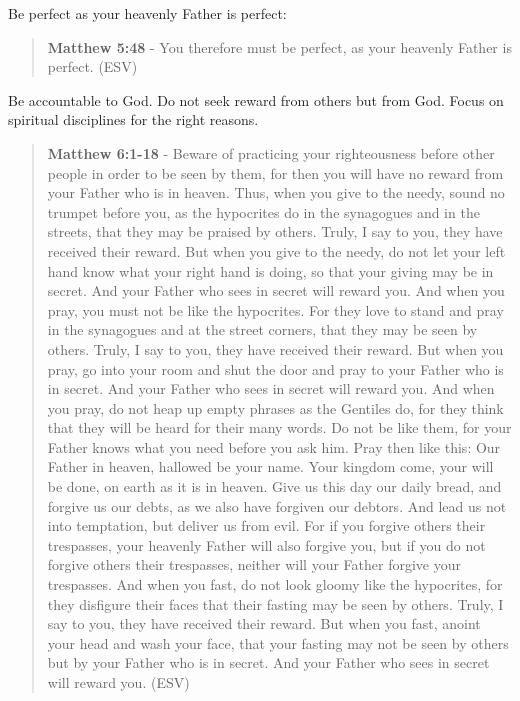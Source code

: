 \documentclass[11pt]{article}
\begin{document}
Be perfect as your heavenly Father is perfect:

\begin{quote}
\textbf{Matthew 5:48} - You therefore must be perfect, as your heavenly Father is perfect. (ESV)
\end{quote}

Be accountable to God. Do not seek reward from others but from God. Focus on spiritual disciplines for the right reasons. 

\begin{quote}
\textbf{Matthew 6:1-18} - Beware of practicing your righteousness before other people in order to be seen by them, for then you will have no reward from your Father who is in heaven. Thus, when you give to the needy, sound no trumpet before you, as the hypocrites do in the synagogues and in the streets, that they may be praised by others. Truly, I say to you, they have received their reward. But when you give to the needy, do not let your left hand know what your right hand is doing, so that your giving may be in secret. And your Father who sees in secret will reward you. And when you pray, you must not be like the hypocrites. For they love to stand and pray in the synagogues and at the street corners, that they may be seen by others. Truly, I say to you, they have received their reward. But when you pray, go into your room and shut the door and pray to your Father who is in secret. And your Father who sees in secret will reward you. And when you pray, do not heap up empty phrases as the Gentiles do, for they think that they will be heard for their many words. Do not be like them, for your Father knows what you need before you ask him. Pray then like this: Our Father in heaven, hallowed be your name. Your kingdom come, your will be done, on earth as it is in heaven. Give us this day our daily bread, and forgive us our debts, as we also have forgiven our debtors. And lead us not into temptation, but deliver us from evil. For if you forgive others their trespasses, your heavenly Father will also forgive you, but if you do not forgive others their trespasses, neither will your Father forgive your trespasses. And when you fast, do not look gloomy like the hypocrites, for they disfigure their faces that their fasting may be seen by others. Truly, I say to you, they have received their reward. But when you fast, anoint your head and wash your face, that your fasting may not be seen by others but by your Father who is in secret. And your Father who sees in secret will reward you. (ESV)
\end{quote}
\end{document}
